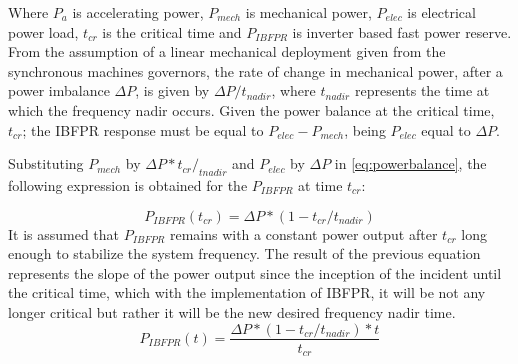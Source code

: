 Where $ P_a $ is accelerating power, $ P_{mech} $ is mechanical power, $ P_{elec} $ is electrical power load, $ t_{cr} $ is the critical time and $ P_{IBFPR} $ is inverter based fast power reserve.
From the assumption of a linear mechanical deployment given from the synchronous machines governors, the rate of change in mechanical power, after a power imbalance $ \Delta P $, is given by $ \Delta P/t_{nadir} $, where $ t_{nadir} $ represents the time at which the frequency nadir occurs. Given the power balance at the critical time, $ t_{cr} $; the IBFPR response must be equal to $ P_{elec}-P_{mech} $, being $ P_{elec} $ equal to $ \Delta P $. %


Substituting $ P_{mech} $ by $ \Delta P* t_{cr} /_{tnadir} $ and $ P_{elec} $ by $ \Delta P $ in \eqref{eq:powerbalance}, the following expression is obtained for the $ P_{IBFPR} $ at time $ t_{cr} $:

\begin{equation}
	\label{eq:p_at_tcr}
	P_{IBFPR} (t_{cr} )=\Delta P*(1-t_{cr}/t_{nadir} )
\end{equation}
It is assumed that $ P_{IBFPR} $ remains with a constant power output after $ t_{cr} $ long enough to stabilize the system frequency. The result of the previous equation represents the slope of the power output since the inception of the incident until the critical time, which with the implementation of IBFPR, it will be not any longer critical but rather it will be the new desired frequency nadir time.
\begin{equation}
	\label{eq:IBFPR}
	P_{IBFPR} (t)=\dfrac{\Delta P*(1-t_{cr}/t_{nadir} )*t}{t_{cr}}
\end{equation}

